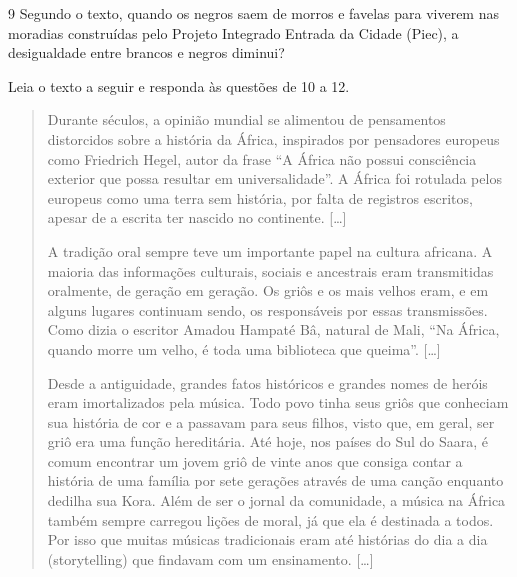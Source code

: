 \num{9} Segundo o texto, quando os negros saem de morros e favelas para viverem nas
moradias construídas pelo Projeto Integrado Entrada da Cidade (Piec), a
desigualdade entre brancos e negros diminui?


Leia o texto a seguir e responda às questões de 10 a 12.


\begin{quote}
Durante séculos, a opinião mundial se alimentou de pensamentos
distorcidos sobre a história da África, inspirados por pensadores
europeus como Friedrich Hegel, autor da frase “A África não possui
consciência exterior que possa resultar em universalidade”. A África
foi rotulada pelos europeus como uma terra sem história, por falta de
registros escritos, apesar de a escrita ter nascido no continente. {[}\ldots{}{]}

A tradição oral sempre teve um importante papel na cultura africana. A
maioria das informações culturais, sociais e ancestrais eram
transmitidas oralmente, de geração em geração. Os griôs e os mais
velhos eram, e em alguns lugares continuam sendo, os responsáveis por
essas transmissões. Como dizia o escritor Amadou Hampaté Bâ, natural de
Mali, “Na África, quando morre um velho, é toda uma biblioteca que
queima”. {[}\ldots{}{]}

Desde a antiguidade, grandes fatos históricos e grandes nomes de heróis
eram imortalizados pela música. Todo povo tinha seus griôs que conheciam
sua história de cor e a passavam para seus filhos, visto que, em geral,
ser griô era uma função hereditária. Até hoje, nos países do Sul do
Saara, é comum encontrar um jovem griô de vinte anos que consiga contar
a história de uma família por sete gerações através de uma canção
enquanto dedilha sua Kora. Além de ser o jornal da comunidade, a música
na África também sempre carregou lições de moral, já que ela é destinada
a todos. Por isso que muitas músicas tradicionais eram até histórias do
dia a dia (storytelling) que findavam com um ensinamento. {[}\ldots{}{]}

\end{quote}

